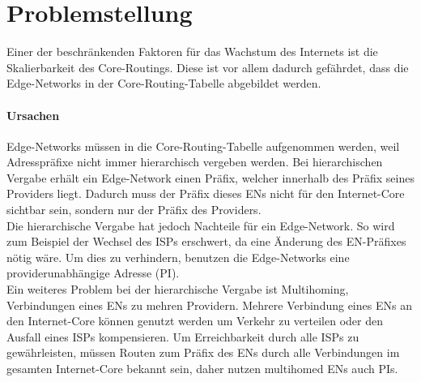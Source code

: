 \section{Problemstellung}

Einer der beschränkenden Faktoren für das Wachstum des Internets ist die Skalierbarkeit des Core-Routings. Diese ist vor allem dadurch gefährdet, dass die Edge-Networks in der Core-Routing-Tabelle abgebildet werden.

\paragraph{Ursachen}
Edge-Networks müssen in die Core-Routing-Tabelle aufgenommen werden, weil Adresspräfixe nicht immer hierarchisch vergeben werden. Bei hierarchischen Vergabe erhält ein Edge-Network einen Präfix, welcher innerhalb des Präfix seines Providers liegt. Dadurch muss der Präfix dieses ENs nicht für den Internet-Core sichtbar sein, sondern nur der Präfix des Providers. \\
Die hierarchische Vergabe hat jedoch Nachteile für ein Edge-Network. So wird zum Beispiel der Wechsel des ISPs erschwert, da eine Änderung des EN-Präfixes nötig wäre. Um dies zu verhindern, benutzen die Edge-Networks eine providerunabhängige Adresse (PI). \\
Ein weiteres Problem bei der hierarchische Vergabe ist Multihoming, Verbindungen eines ENs zu mehren Providern. Mehrere Verbindung eines ENs an den Internet-Core können genutzt werden um Verkehr zu verteilen oder den Ausfall eines ISPs kompensieren. Um Erreichbarkeit durch alle ISPs zu gewährleisten, müssen Routen zum Präfix des ENs durch alle Verbindungen im gesamten Internet-Core bekannt sein, daher nutzen multihomed ENs auch PIs.

